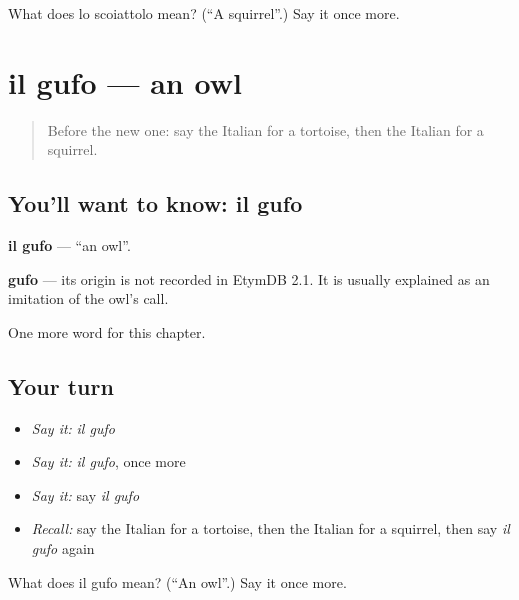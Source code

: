 \begin{tcolorbox}[breakable,colback=teal!4,colframe=teal!35!black,title={Before you move on}]
What does lo scoiattolo mean? (\textquotedblleft{}A squirrel\textquotedblright{}.) Say it once more.
\end{tcolorbox}
\section[il gufo]{il gufo — an owl}

\label{lesson:IT-C121-gufo}



\begin{quote}
Before the new one: say the Italian for a tortoise, then the Italian for a squirrel.
\end{quote}

\subsection*{You'll want to know: il gufo}
\textbf{il gufo} — \textquotedblleft{}an owl\textquotedblright{}.

\begin{cousinweb}
\textbf{gufo} — its origin is not recorded in EtymDB 2.1. It is usually explained as an imitation of the owl's call.
\end{cousinweb}

\begin{grammarlens}[title={What you've built}]
One more word for this chapter.
\end{grammarlens}

\subsection*{Your turn}
\begin{itemize}
\raggedright
  \item \emph{Say it:} \emph{il gufo}
  \item \emph{Say it:} \emph{il gufo}, once more
  \item \emph{Say it:} say \emph{il gufo}
  \item \emph{Recall:} say the Italian for a tortoise, then the Italian for a squirrel, then say \emph{il gufo} again
\end{itemize}

\begin{tcolorbox}[breakable,colback=teal!4,colframe=teal!35!black,title={Before you move on}]
What does il gufo mean? (\textquotedblleft{}An owl\textquotedblright{}.) Say it once more.
\end{tcolorbox}

